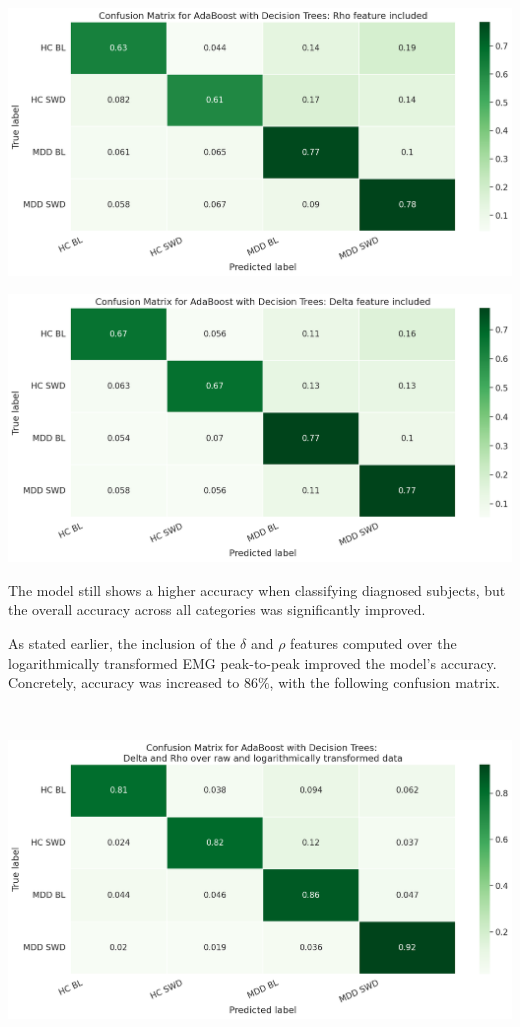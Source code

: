 \documentclass{article}
\begin{document}
~

\includegraphics[scale=0.24]{cm-rho}
\raggedright
\includegraphics[scale=0.24]{cm-delta}



\justifying
\begin{multicols}{2}

The model still shows a higher accuracy when classifying diagnosed subjects, but
the overall accuracy across all categories was significantly improved.

As stated earlier, the inclusion of the $\delta$ and $\rho$ features computed
over the logarithmically transformed EMG peak-to-peak improved the model's
accuracy. Concretely, accuracy was increased to $86\%$, with the following
confusion matrix.

\end{multicols}

~
\centering

\includegraphics[scale=0.4]{cm-dr-ln}
\end{document}
